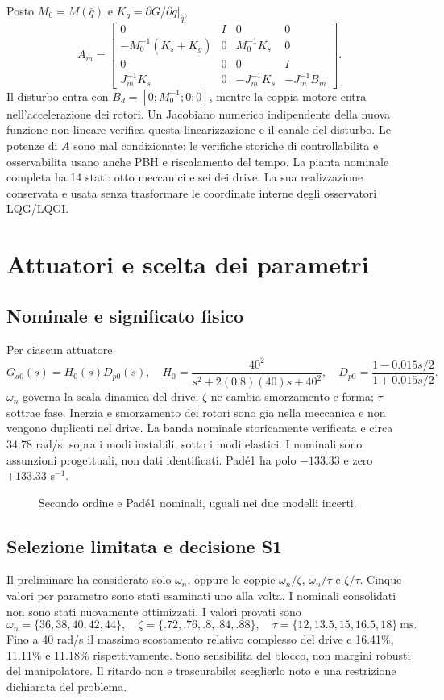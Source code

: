 \documentclass[11pt,a4paper,oneside]{report}
\newcommand{\schema}[2]{\begin{figure}[htbp]\centering\resizebox{.95\linewidth}{!}{}\caption{#2}\end{figure}}
\begin{document}
Posto $M_0=M(\bar q)$ e $K_g=\partial G/\partial q|_{\bar q}$,
\[
A_m=\begin{bmatrix}0&I&0&0\\-M_0^{-1}(K_s+K_g)&0&M_0^{-1}K_s&0\\
0&0&0&I\\J_m^{-1}K_s&0&-J_m^{-1}K_s&-J_m^{-1}B_m\end{bmatrix}.
\]
Il disturbo entra con $B_d=[0;M_0^{-1};0;0]$, mentre la coppia motore entra
nell'accelerazione dei rotori. Un Jacobiano numerico indipendente della
nuova funzione non lineare verifica questa linearizzazione e il canale del
disturbo. Le potenze di $A$ sono mal condizionate: le verifiche storiche di
controllabilita e osservabilita usano anche PBH e riscalamento del tempo.
La pianta nominale completa ha 14 stati: otto meccanici e sei dei drive.
La sua realizzazione conservata e usata senza trasformare le coordinate
interne degli osservatori LQG/LQGI.

\chapter{Attuatori e scelta dei parametri}
\section{Nominale e significato fisico}
Per ciascun attuatore
\[
G_{a0}(s)=H_0(s)D_{p0}(s),\quad
H_0=\frac{40^2}{s^2+2(0.8)(40)s+40^2},\quad
D_{p0}=\frac{1-0.015s/2}{1+0.015s/2}.
\]
$\omega_n$ governa la scala dinamica del drive; $\zeta$ ne cambia smorzamento
e forma; $\tau$ sottrae fase. Inerzia e smorzamento dei rotori sono gia
nella meccanica e non vengono duplicati nel drive.
La banda nominale storicamente verificata e circa 34.78 rad/s: sopra i
modi instabili, sotto i modi elastici. I nominali sono assunzioni progettuali,
non dati identificati. Padé1 ha polo $-133.33$ e zero $+133.33$ s$^{-1}$.
\schema{nominale}{Secondo ordine e Padé1 nominali, uguali nei due modelli incerti.}
\section{Selezione limitata e decisione S1}
Il preliminare ha considerato solo $\omega_n$, oppure le coppie
$\omega_n/\zeta$, $\omega_n/\tau$ e $\zeta/\tau$. Cinque valori per parametro
sono stati esaminati uno alla volta. I nominali consolidati non sono stati
nuovamente ottimizzati. I valori provati sono
\[
\omega_n=\{36,38,40,42,44\},\quad
\zeta=\{.72,.76,.8,.84,.88\},\quad
\tau=\{12,13.5,15,16.5,18\}\ \mathrm{ms}.
\]
Fino a 40 rad/s il massimo scostamento relativo complesso del drive e
16.41\%, 11.11\% e 11.18\% rispettivamente. Sono sensibilita del blocco,
non margini robusti del manipolatore. Il ritardo non e trascurabile:
sceglierlo noto e una restrizione dichiarata del problema.
\end{document}
